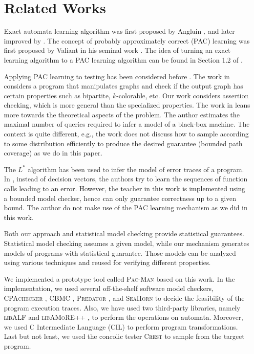 \chapter{Related Works}\label{ch:related}

Exact automata learning algorithm was first proposed by Angluin \cite{Angluin87}, and later improved by \cite{Angluin87,RivestS93,KearnsV94,BolligHKL09}. The concept of probably approximately correct (PAC) learning was first proposed by Valiant in his seminal work \cite{Valiant84}. The idea of turning an exact learning algorithm to a PAC learning algorithm can be found in Section 1.2 of \cite{Angluin88}.

Applying PAC learning to testing has been considered before \cite{Walkinshaw11,GoldreichGR98}. The work in \cite{GoldreichGR98} considers a program that manipulates graphs and check if the output graph has certain properties such as bipartite, $k$-colorable, etc. Our work considers assertion checking, which is more general than the specialized properties. The work in \cite{Walkinshaw11} leans more towards the theoretical aspects of the problem. The author estimates the maximal number of queries required to infer a model of a black-box machine. The context is quite different, e.g., the work does not discuss how to sample according to some distribution efficiently to produce the desired guarantee (bounded path coverage) as we do in this paper. 

The $L^\ast$ algorithm has been used to infer the model of error traces of a program. In \cite{ChapmanCKKST15}, instead of decision vectors, the authors try to learn the sequences of function calls leading to an error. However, the teacher in this work is implemented using a bounded model checker, hence can only guarantee correctness up to a given bound. The author do not make use of the PAC learning mechanism as we did in this work. 

Both our approach and statistical model checking \cite{SenVA04,LegayDB10,ZulianiPC13} provide statistical guarantees. Statistical model checking assumes a given model, while our mechanism generates models of programs with statistical guarantee. Those models can be analyzed using various techniques and reused for verifying different properties.

We implemented a prototype tool called \textsc{Pac-Man} based on this work. In the implementation, we used several off-the-shelf software model checkers, \textsc{CPAchecker} \cite{BeyerK11}, \textsc{CBMC} \cite{ClarkeKL04}, \textsc{Predator} \cite{DudkaPV11}, and \textsc{SeaHorn} \cite{GurfinkelKKN15} to decide the feasibility of the program execution traces. Also, we have used two third-party libraries, namely \textsc{libALF} \cite{BolligKKLNP10} and \textsc{libAMoRE++} \cite{MatzMPTV95}, to perform the operations on automata. Moreover, we used C Intermediate Language (CIL) \cite{NeculaMRW02} \cite{cil} to perform program transformations. Last but not least, we used the concolic tester \textsc{Crest} \cite{BurnimS08} to sample from the targeet program. 


